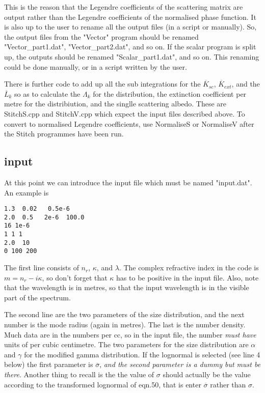 \begin{flushleft}
This is the reason that the Legendre coefficients of the scattering matrix
are output rather than the Legendre coefficients of the normalised phase function.
It is also up to the user to rename all the output files (in a script or manually).
So, the output files from the "Vector" program should be renamed "Vector\_part1.dat",
 "Vector\_part2.dat", and so on. If the scalar program is split up, the outputs
should be renamed "Scalar\_part1.dat", and so on. This renaming could be done
 manually, or in a script written by the user.



There is  further code to add up all the sub integrations for the ${\overline K_{sc}}$,
 ${\overline K_{ext}}$, 
and the ${\overline L_k}$ so as to calculate the $\Lambda_k$
for the distribution, the extinction coefficient per metre for the distribiution, and
the singlle scattering albedo. These are StitchS.cpp and StitchV.cpp which expect the 
input files described above. To convert to normalised Legendre coefficients, use NormaliseS or NormaliseV after the Stitch programmes have been run.


\subsection{input}
At this point we can introduce the input file which must be named "input.dat".
An example is
\begin{verbatim}
1.3  0.02   0.5e-6         
2.0  0.5   2e-6  100.0
16 1e-6
1 1 1
2.0  10
0 100 200
\end{verbatim}
The first line consists of $n_r$, $\kappa$, and $\lambda$. The complex
refractive index  in the code is $m=n_r-i \kappa$, so don't forget that $\kappa$ has
to be positive in the input file. Also, note that the wavelength is in metres,
so that the input wavelength is in the visible part of the spectrum.

The second line are the two  parameters of the size distribution,
and the next number is the mode radius (again in metres). The last is
the number density. Much data are in the numbers per cc, so in the input
file, the number {\it must have} units of per cubic centimetre.
 The two parameters for the 
size distribution are $\alpha$ and $\gamma$ for the modified gamma distribution.
If the lognormal is selected (see line 4 below) the first parameter is 
${\overline \sigma}$, {\it and the second parameter is a dummy but must be there}. 
Another thing to recall is the the value of $\sigma$ should actually be
the value according to the transformed lognormal of eqn.50, that is
enter ${\overline \sigma}$ rather than $\sigma$.  


\end{flushleft}
